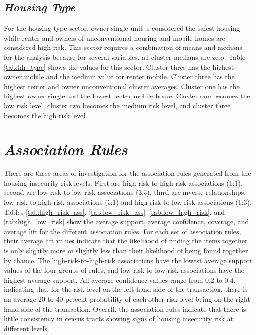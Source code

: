 \subsection{\textit{Housing Type}}
For the housing type sector, owner single unit is considered the safest housing while renter and owners of unconventional housing and mobile homes are considered high risk. This sector requires a combination of means and medians for the analysis because for several variables, all cluster medians are zero. Table \ref{tab:hh_type} shows the values for this sector. Cluster three has the highest owner mobile and the medium value for renter mobile. Cluster three has the highest renter and owner unconventional cluster averages. Cluster one has the highest owner single and the lowest renter mobile home. Cluster one becomes the low risk level, cluster two becomes the medium risk level, and cluster three becomes the high risk level.




\section{\textit{Association Rules}}

There are three areas of investigation for the association rules generated from the housing insecurity risk levels. First are high-risk-to-high-risk associations (1:1), second are low-risk-to-low-risk associations (3:3), third are inverse relationships: low-risk-to-high-risk associations (3:1) and high-risk-to-low-risk associations (1:3). Tables \ref{tab:high_risk_ass}, \ref{tab:low_risk_ass}, \ref{tab:low_high_risk}, and \ref{tab:high_low_risk} show the average support, average confidence, coverage, and average lift for the different association rules. For each set of association rules, their average lift values indicate that the likelihood of finding the items together is only slightly more or slightly less than their likelihood of being found together by chance. The high-risk-to-high-risk associations have the lowest average support values of the four groups of rules, and low-risk-to-low-risk associations have the highest average support. All average confidence values range from 0.2 to 0.4, indicating that for the risk level on the left-hand side of the transaction, there is an average 20 to 40 percent probability of each other risk level being on the right-hand side of the transaction. Overall, the association rules indicate that there is little consistency in census tracts showing signs of housing insecurity risk at different levels. 




